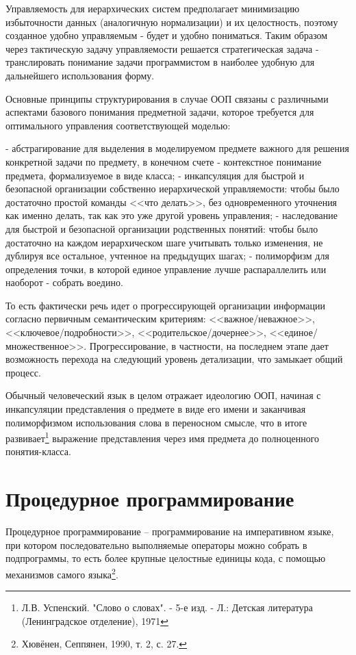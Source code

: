 \documentclass[12pt, twoside]{report}
\begin{document}
Управляемость для иерархических систем предполагает минимизацию избыточности данных (аналогичную нормализации) и их целостность, поэтому созданное удобно управляемым - будет и удобно пониматься. Таким образом через тактическую задачу управляемости решается стратегическая задача - транслировать понимание задачи программистом в наиболее удобную для дальнейшего использования форму.

Основные принципы структурирования в случае ООП связаны с различными аспектами базового понимания предметной задачи, которое требуется для оптимального управления соответствующей моделью:

- абстрагирование для выделения в моделируемом предмете важного для решения конкретной задачи по предмету, в конечном счете - контекстное понимание предмета, формализуемое в виде класса;
- инкапсуляция для быстрой и безопасной организации собственно иерархической управляемости: чтобы было достаточно простой команды <<что делать>>, без одновременного уточнения как именно делать, так как это уже другой уровень управления;
- наследование для быстрой и безопасной организации родственных понятий: чтобы было достаточно на каждом иерархическом шаге учитывать только изменения, не дублируя все остальное, учтенное на предыдущих шагах;
- полиморфизм для определения точки, в которой единое управление лучше распараллелить или наоборот - собрать воедино.

То есть фактически речь идет о прогрессирующей организации информации согласно первичным семантическим критериям: <<важное/неважное>>, <<ключевое/подробности>>, <<родительское/дочернее>>, <<единое/множественное>>. Прогрессирование, в частности, на последнем этапе дает возможность перехода на следующий уровень детализации, что замыкает общий процесс.

Обычный человеческий язык в целом отражает идеологию ООП, начиная с инкапсуляции представления о предмете в виде его имени и заканчивая полиморфизмом использования слова в переносном смысле, что в итоге развивает\footnote{Л.В. Успенский. "Слово о словах". - 5-е изд. - Л.: Детская литература (Ленинградское отделение), 1971} выражение представления через имя предмета до полноценного понятия-класса.

\section*{Процедурное программирование}

Процедурное программирование -- программирование на императивном языке, при котором последовательно выполняемые операторы можно собрать в подпрограммы, то есть более крупные целостные единицы кода, с помощью механизмов самого языка\footnote{Хювёнен, Сеппянен, 1990, т. 2, с. 27.}.
\end{document}
